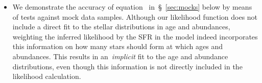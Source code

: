 \documentclass[ms.tex]{subfiles}
\begin{document}
\begin{itemize}
\begin{itemize}
	\end{itemize}

	\item 
	We demonstrate the accuracy of equation~
	in~\S~\ref{sec:mocks} below by means of tests against mock data samples.
	Although our likelihood function does not include a direct fit to
	the stellar distributions in age and abundances, weighting the inferred
	likelihood by the SFR in the model indeed incorporates this information on
	how many stars should form at which ages and abundances.
	This results in an~\textit{implicit} fit to the age and abundance
	distributions, even though this information is not directly included in the
	likelihood calculation.


\end{itemize}
\end{document}

